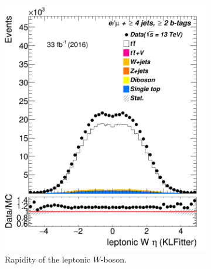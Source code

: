 \begin{figure}
\begin{subfigure}{0.25\textwidth}
			\includegraphics[width=\linewidth]{ControlPlots_emujets_2016_4incl_2incl/klf_Wlep_eta_emujets_2016.png}
			\caption{Rapidity of the leptonic $W$-boson.} \label{fig:K25}
		\end{subfigure}
	\hspace*{0.5cm}
		\begin{subfigure}{0.25\textwidth}

\end{subfigure}
\end{figure}
